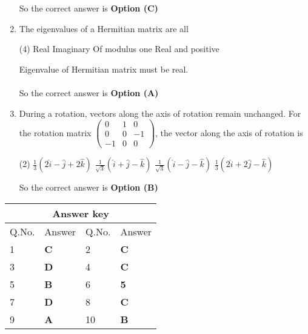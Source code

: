 \begin{enumerate}[label=\color{ocre}\textbf{\arabic*.}]
\begin{answer}
		So the correct answer is \textbf{Option (C)}
	\end{answer}
	\item The eigenvalues of a Hermitian matrix are all
	{}
	\begin{tasks}(4)
		\task[\textbf{A.}]  Real
		\task[\textbf{B.}] Imaginary
		\task[\textbf{C.}] Of modulus one
		\task[\textbf{D.}] Real and positive
	\end{tasks}
	\begin{answer}
		Eigenvalue of Hermitian matrix must be real.\\\\
		So the correct answer is \textbf{Option (A)}
	\end{answer}
	\item During a rotation, vectors along the axis of rotation remain unchanged. For the rotation matrix $\left(\begin{array}{ccc}0 & 1 & 0 \\ 0 & 0 & -1 \\ -1 & 0 & 0\end{array}\right)$, the vector along the axis of rotation is
	{}
	\begin{tasks}(2)
		\task[\textbf{A.}] $\frac{1}{3}(2 \hat{i}-\hat{j}+2 \hat{k})$
		\task[\textbf{B.}]  $\frac{1}{\sqrt{3}}(\hat{i}+\hat{j}-\hat{k})$
		\task[\textbf{C.}] $\frac{1}{\sqrt{3}}(\hat{i}-\hat{j}-\hat{k})$
		\task[\textbf{D.}] $\frac{1}{3}(2 \hat{i}+2 \hat{j}-\hat{k})$
	\end{tasks}
	\begin{answer}
		So the correct answer is \textbf{Option (B)}
	\end{answer}
\end{enumerate}
\setlength\arrayrulewidth{1pt}
\begin{table}[H]
	\centering
	\begin{tabular}{|p{1.5cm}|p{1.5cm}||p{1.5cm}|p{1.5cm}|}
		\hline
		\multicolumn{4}{|c|}{\textbf{Answer key}}\\\hline\hline
		\rowcolor{ocrel}Q.No.&Answer&Q.No.&Answer\\\hline
		1&\textbf{C} &2&\textbf{C}\\\hline 
		3&\textbf{D} &4&\textbf{C} \\\hline
		5&\textbf{B} &6&\textbf{5} \\\hline
		7&\textbf{D}&8&\textbf{C}\\\hline
		9&\textbf{A}&10&\textbf{B}\\\hline
		
	\end{tabular}
\end{table}